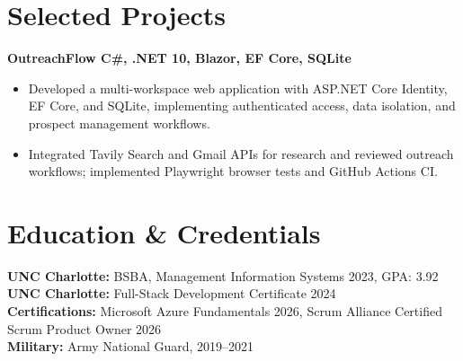 \documentclass[letterpaper,11pt]{article}
\newenvironment{bullets}{\begin{itemize}[label=$\bullet$,leftmargin=0.15in,itemsep=1pt,parsep=0pt,topsep=4pt]}{\end{itemize}\vspace{-3pt}}
\begin{document}
\section{Selected Projects}
\textbf{OutreachFlow \textbar{} C\#, .NET 10, Blazor, EF Core, SQLite}
\begin{bullets}
\item Developed a multi-workspace web application with ASP.NET Core Identity, EF Core, and SQLite, implementing authenticated access, data isolation, and prospect management workflows.
\item Integrated Tavily Search and Gmail APIs for research and reviewed outreach workflows; implemented Playwright browser tests and GitHub Actions CI.
\end{bullets}

\section{Education \& Credentials}
\textbf{UNC Charlotte:} BSBA, Management Information Systems 2023, GPA: 3.92\\
\textbf{UNC Charlotte:} Full-Stack Development Certificate 2024\\
\textbf{Certifications:} Microsoft Azure Fundamentals 2026, Scrum Alliance Certified Scrum Product Owner 2026\\
\textbf{Military:} Army National Guard, 2019--2021
\end{document}
